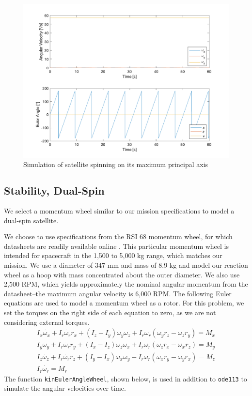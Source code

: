 \begin{figure}[H]
\centering
\includegraphics[scale=0.6]{Images/ps4_problem2a_3.png}
\caption{Simulation of satellite spinning on its maximum principal axis}
\label{fig:ps4_problem2a_3}
\end{figure}

\subsection{Stability, Dual-Spin}
We select a momentum wheel similar to our mission specifications to model a dual-spin satellite.

We choose to use specifications from the RSI 68 momentum wheel, for which datasheets are readily available online \cite{RSI68}. This particular momentum wheel is intended for spacecraft in the 1,500 to 5,000 kg range, which matches our mission. We use a diameter of 347 mm and mass of 8.9 kg and model our reaction wheel as a hoop with mass concentrated about the outer diameter. We also use 2,500 RPM, which yields approximately the nominal angular momentum from the datasheet–the maximum angular velocity is 6,000 RPM. The following Euler equations are used to model a momentum wheel as a rotor. For this problem, we set the torques on the right side of each equation to zero, as we are not considering external torques.
\begin{align*}
    I_x \dot{\omega_x} + I_r \dot{\omega_r} r_x + (I_z - I_y) \omega_y \omega_z 
    + I_r \omega_r (\omega_y r_z - \omega_z r_y) = M_x \\
    I_y \dot{\omega_y} + I_r \dot{\omega_r} r_y + (I_x - I_z) \omega_z \omega_x 
    + I_r \omega_r (\omega_z r_x - \omega_x r_z) = M_y \\
    I_z \dot{\omega_z} + I_r \dot{\omega_r} r_z + (I_y - I_x) \omega_x \omega_y 
    + I_r \omega_r (\omega_x r_y - \omega_y r_x) = M_z \\
    I_r \dot{\omega_r} = M_r
\end{align*}
The function \texttt{kinEulerAngleWheel}, shown below, is used in addition to \texttt{ode113} to simulate the angular velocities over time.

